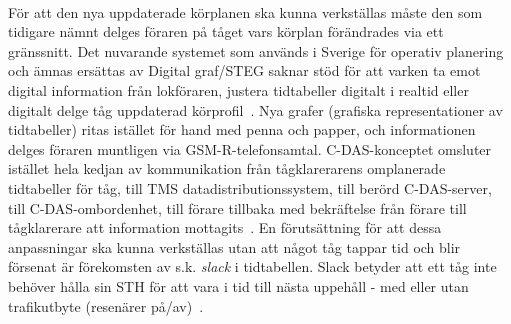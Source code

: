 \paragraph{}
\hspace{-12pt}För att den nya uppdaterade körplanen ska kunna verkställas måste den som tidigare nämnt delges föraren på tåget vars körplan förändrades via ett gränssnitt.
Det nuvarande systemet som används i Sverige för operativ planering och ämnas ersättas av Digital graf/STEG saknar stöd för att varken ta emot digital information från lokföraren, justera tidtabeller digitalt i realtid eller digitalt delge tåg uppdaterad körprofil~\cite{Systemdefinition2019, Joborn2023}.
Nya grafer (grafiska representationer av tidtabeller) ritas istället för hand med penna och papper, och informationen delges föraren muntligen via GSM-R-telefonsamtal.
C-DAS-konceptet omsluter istället hela kedjan av kommunikation från tågklarerarens omplanerade tidtabeller för tåg, till TMS datadistributionssystem, till berörd C-DAS-server, till C-DAS-ombordenhet, till förare tillbaka med bekräftelse från förare till tågklarerare att information mottagits~\cite{IRS90940}.
En förutsättning för att dessa anpassningar ska kunna verkställas utan att något tåg tappar tid och blir försenat är förekomsten av s.k. \emph{slack} i tidtabellen.
Slack betyder att ett tåg inte behöver hålla sin STH för att vara i tid till nästa uppehåll - med eller utan trafikutbyte (resenärer på/av)~\cite{Lindmark2022}.
